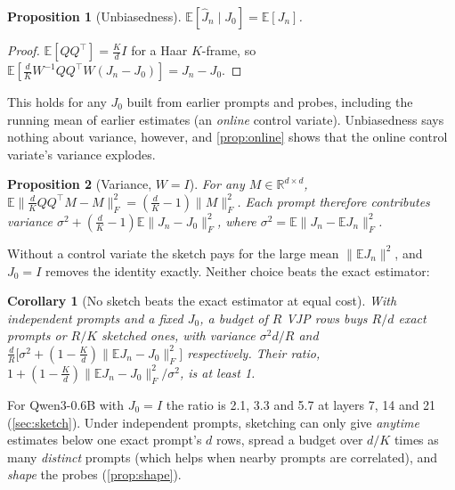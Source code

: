 \documentclass[11pt]{article}
\newtheorem{proposition}{Proposition}
\newtheorem{corollary}{Corollary}
\theoremstyle{definition}
\newcommand{\E}{\mathbb{E}}
\newcommand{\R}{\mathbb{R}}
\begin{document}
\begin{proposition}[Unbiasedness]
$\E[\hat J_n\mid J_0]=\E[J_n]$.
\end{proposition}
\begin{proof}
$\E[QQ^{\top}]=\frac{K}{d}I$ for a Haar $K$-frame, so
$\E[\frac{d}{K}W^{-1}QQ^{\top}W(J_n-J_0)]=J_n-J_0$.
\end{proof}
This holds for any $J_0$ built from earlier prompts and probes, including the running mean of
earlier estimates (an \emph{online} control variate). Unbiasedness says nothing about variance,
however, and \cref{prop:online} shows that the online control variate's variance explodes.

\begin{proposition}[Variance, $W=I$]
\label{prop:var}
For any $M\in\R^{d\times d}$, $\E\|\frac{d}{K}QQ^{\top}M-M\|_F^2=(\frac{d}{K}-1)\|M\|_F^2$. Each prompt
therefore contributes variance $\sigma^2+(\frac{d}{K}-1)\E\|J_n-J_0\|_F^2$, where
$\sigma^2=\E\|J_n-\E J_n\|_F^2$.
\end{proposition}
Without a control variate the sketch pays for the large mean $\|\E J_n\|^2$, and $J_0=I$ removes the
identity exactly. Neither choice beats the exact estimator:

\begin{corollary}[No sketch beats the exact estimator at equal cost]
\label{cor:cost}
With independent prompts and a fixed $J_0$, a budget of $R$ VJP rows buys $R/d$ exact prompts or $R/K$
sketched ones, with variance $\sigma^2 d/R$ and $\frac{d}{R}\big[\sigma^2+(1-\frac{K}{d})\|\E J_n-J_0\|_F^2\big]$
respectively. Their ratio, $1+(1-\frac{K}{d})\|\E J_n-J_0\|_F^2/\sigma^2$, is at least 1.
\end{corollary}
For Qwen3-0.6B with $J_0=I$ the ratio is 2.1, 3.3 and 5.7 at layers 7, 14 and 21 (\cref{sec:sketch}).
Under independent prompts, sketching can only give \emph{anytime} estimates below one exact prompt's
$d$ rows, spread a budget over $d/K$ times as many \emph{distinct} prompts (which helps when nearby
prompts are correlated), and \emph{shape} the probes (\cref{prop:shape}).
\end{document}
